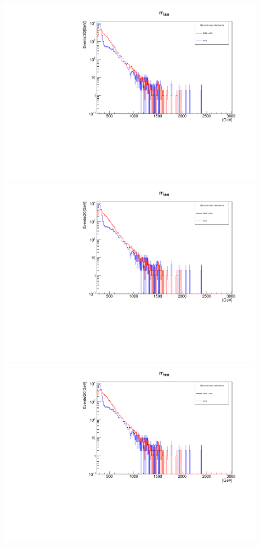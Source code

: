 \documentclass[a4wide,10pt]{article}
\begin{document}
\includegraphics[scale=0.50,page=1]{InterferencePlots20p.pdf}
\includegraphics[scale=0.50,page=2]{InterferencePlots20p.pdf}
\includegraphics[scale=0.50,page=3]{InterferencePlots20p.pdf}
\end{document}
